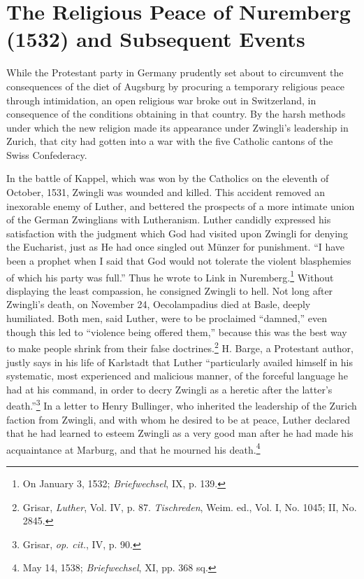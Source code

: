 \section{The Religious Peace of Nuremberg (1532) and Subsequent Events}

While the Protestant party in Germany prudently set about to
circumvent the consequences of the diet of Augsburg by procuring
a temporary religious peace through intimidation, an open religious
war broke out in Switzerland, in consequence of the conditions
obtaining in that country. By the harsh methods under which the
new religion made its appearance under Zwingli’s leadership in
Zurich, that city had gotten into a war with the five Catholic
cantons of the Swiss Confederacy.

In the battle of Kappel, which was won by the Catholics on the
eleventh of October, 1531, Zwingli was wounded and killed. This
accident removed an inexorable enemy of Luther, and bettered the
prospects of a more intimate union of the German Zwinglians with
Lutheranism. Luther candidly expressed his satisfaction with the
judgment which God had visited upon Zwingli for denying the Eucharist,
just as He had once singled out Münzer for punishment. “I
have been a prophet when I said that God would not tolerate the
violent blasphemies of which his party was full.” Thus he wrote to
Link in Nuremberg.\footnote{On January 3, 1532; \textit{Briefwechsel}, IX, p. 139.}
 Without displaying the least compassion, he
consigned Zwingli to hell. Not long after Zwingli’s death, on November
24, Oecolampadius died at Basle, deeply humiliated. Both men,
said Luther, were to be proclaimed “damned,” even though this led to
“violence being offered them,” because this was the best way to
make people shrink from their false doctrines.\footnote{Grisar, \textit{Luther}, Vol. IV, p. 87. \textit{Tischreden}, Weim. ed., Vol. I, No. 1045; II, No. 2845.}
 H. Barge, a Protestant
author, justly says in his life of Karlstadt that Luther “particularly
availed himself in his systematic, most experienced and malicious
manner, of the forceful language he had at his command, in order
to decry Zwingli as a heretic after the latter’s death.”\footnote{Grisar, \textit{op. cit.}, IV, p. 90.}
 In a letter
to Henry Bullinger, who inherited the leadership of the Zurich
faction from Zwingli, and with whom he desired to be at peace,
Luther declared that he had learned to esteem Zwingli as a very
good man after he had made his acquaintance at Marburg, and that
he mourned his death.\footnote{May 14, 1538; \textit{Briefwechsel}, XI, pp. 368 sq.}


